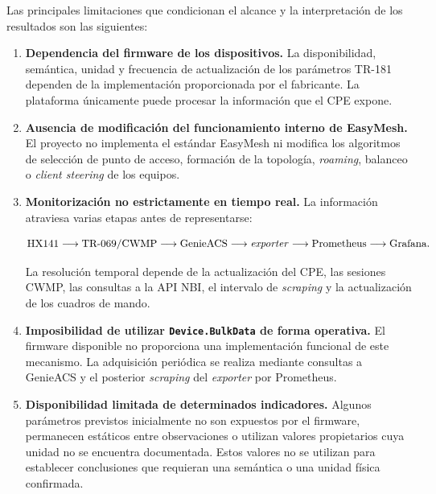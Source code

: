 Las principales limitaciones que condicionan el alcance y la
interpretación de los resultados son las siguientes:

\begin{enumerate}[
    label=\alph*),
    leftmargin=1.2cm,
    itemsep=0.5em,
    topsep=0.5em
]

    \item \textbf{Dependencia del firmware de los dispositivos.} La
    disponibilidad, semántica, unidad y frecuencia de actualización de
    los parámetros TR-181 dependen de la implementación proporcionada por
    el fabricante. La plataforma únicamente puede procesar la información
    que el CPE expone.

    \item \textbf{Ausencia de modificación del funcionamiento interno de
    EasyMesh.} El proyecto no implementa el estándar EasyMesh ni modifica
    los algoritmos de selección de punto de acceso, formación de la
    topología, \textit{roaming}, balanceo o \textit{client steering} de
    los equipos.

    \item \textbf{Monitorización no estrictamente en tiempo real.} La
    información atraviesa varias etapas antes de representarse:

    \[
        \text{HX141}
        \longrightarrow
        \text{TR-069/CWMP}
        \longrightarrow
        \text{GenieACS}
        \longrightarrow
        \text{\textit{exporter}}
        \longrightarrow
        \text{Prometheus}
        \longrightarrow
        \text{Grafana}.
    \]

    La resolución temporal depende de la actualización del CPE, las
    sesiones CWMP, las consultas a la API NBI, el intervalo de
    \textit{scraping} y la actualización de los cuadros de mando.

    \item \textbf{Imposibilidad de utilizar
    \texttt{Device.BulkData} de forma operativa.} El firmware disponible
    no proporciona una implementación funcional de este mecanismo. La
    adquisición periódica se realiza mediante consultas a GenieACS y el
    posterior \textit{scraping} del \textit{exporter} por Prometheus.

    \item \textbf{Disponibilidad limitada de determinados indicadores.}
    Algunos parámetros previstos inicialmente no son expuestos por el
    firmware, permanecen estáticos entre observaciones o utilizan valores
    propietarios cuya unidad no se encuentra documentada. Estos valores
    no se utilizan para establecer conclusiones que requieran una
    semántica o una unidad física confirmada.


\end{enumerate}
